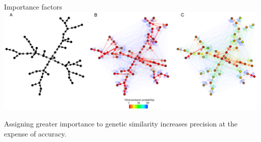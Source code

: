 \documentclass{beamer}
\begin{document}
\begin{frame}{Importance factors}
    \includegraphics[width=\textwidth]{f5}

    \begin{center}
        Assigning greater importance to genetic similarity increases precision
        at the expense of accuracy.
    \end{center}
\end{frame}
\end{document}
